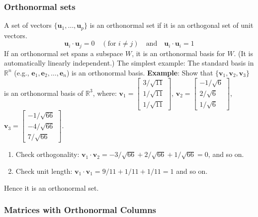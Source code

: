 \documentclass[../linear-algebra.tex]{subfiles}
\begin{document}
\subsubsection{Orthonormal sets}
A set of vectors $\{\mathbf{u}_1, \dots, \mathbf{u}_p\}$ is an orthonormal set if it is an orthogonal set of unit vectors.
$$\mathbf{u}_i \cdot \mathbf{u}_j = 0 \quad (\text{for } i \neq j) \quad \text{and} \quad \mathbf{u}_i \cdot \mathbf{u}_i = 1$$
If an orthonormal set spans a subspace $W$, it is an orthonormal basis for $W$. (It is automatically linearly independent.)\newline
The simplest example: The standard basis in $\mathbb{R}^n$ (e.g., $\mathbf{e}_1, \mathbf{e}_2, \dots, \mathbf{e}_n$) is an orthonormal basis.\newline
\textbf{Example}: Show that $\{\mathbf{v}_1, \mathbf{v}_2, \mathbf{v}_3\}$ is an orthonormal basis of $\mathbb{R}^3$, where:
$\mathbf{v}_1 = \begin{bmatrix} 3/\sqrt{11} \\ 1/\sqrt{11} \\ 1/\sqrt{11} \end{bmatrix}$, $\mathbf{v}_2 = \begin{bmatrix} -1/\sqrt{6} \\ 2/\sqrt{6} \\ 1/\sqrt{6} \end{bmatrix}$, $\mathbf{v}_3 = \begin{bmatrix} -1/\sqrt{66} \\ -4/\sqrt{66} \\ 7/\sqrt{66} \end{bmatrix}$.
\begin{enumerate}
    \item Check orthogonality: $\mathbf{v}_1 \cdot \mathbf{v}_2 = -3/\sqrt{66} + 2/\sqrt{66} + 1/\sqrt{66} = 0$, and so on.
    \item Check unit length: $\mathbf{v}_1 \cdot \mathbf{v}_1 = 9/11 + 1/11 + 1/11 = 1$ and so on.
\end{enumerate}
Hence it is an orthonormal set.

\subsubsection{Matrices with Orthonormal Columns}
\end{document}
